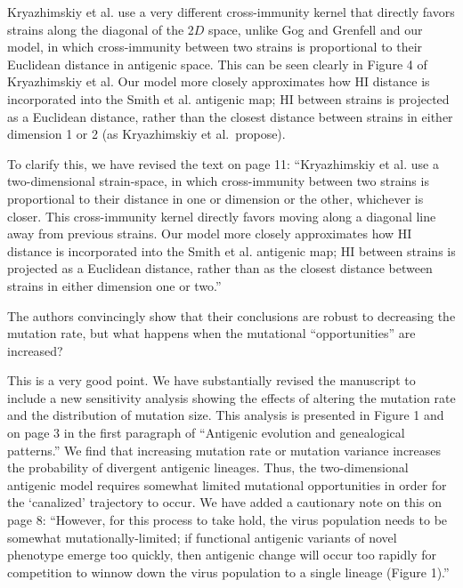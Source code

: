 \documentclass[11pt,oneside,letterpaper]{article}
\def\comment#1{
#1
}
\def\response#1{
\begin{bf}
#1
\end{bf}
}
\def\break{\vspace{0.2cm}}
\begin{document}
\response{Kryazhimskiy et al. \cite{Kryazhimskiy07} use a very different cross-immunity kernel that directly favors strains along the diagonal of the 2$D$ space, unlike Gog and Grenfell \cite{Gog02} and our model, in which cross-immunity between two strains is proportional to their Euclidean distance in antigenic space.  This can be seen clearly in Figure 4 of Kryazhimskiy et al.  Our model more closely approximates how HI distance is incorporated into the Smith et al. \cite{Smith04} antigenic map; HI between strains is projected as a Euclidean distance, rather than the closest distance between strains in either dimension 1 or 2 (as Kryazhimskiy et al.\ propose).}

\response{To clarify this, we have revised the text on page 11: ``Kryazhimskiy et al. \cite{Kryazhimskiy07} use a two-dimensional strain-space, in which cross-immunity between two strains is proportional to their distance in one or dimension or the other, whichever is closer.  This cross-immunity kernel directly favors moving along a diagonal line away from previous strains.  Our model more closely approximates how HI distance is incorporated into the Smith et al. \cite{Smith04} antigenic map; HI between strains is projected as a Euclidean distance, rather than as the closest distance between strains in either dimension one or two.''}

\break

\comment{The authors convincingly show that their conclusions are robust to decreasing the mutation rate, but what happens when the mutational ``opportunities'' are increased?}

\response{This is a very good point.  We have substantially revised the manuscript to include a new sensitivity analysis showing the effects of altering the mutation rate and the distribution of mutation size.  This analysis is presented in Figure 1 and on page 3 in the first paragraph of ``Antigenic evolution and genealogical patterns.'' We find that increasing mutation rate or mutation variance increases the probability of divergent antigenic lineages.  Thus, the two-dimensional antigenic model requires somewhat limited mutational opportunities in order for the `canalized' trajectory to occur.  We have added a cautionary note on this on page 8: ``However, for this process to take hold, the virus population needs to be somewhat mutationally-limited; if functional antigenic variants of novel phenotype emerge too quickly, then antigenic change will occur too rapidly for competition to winnow down the virus population to a single lineage (Figure 1).''}
\end{document}
